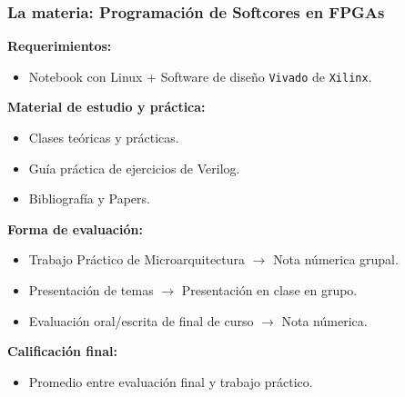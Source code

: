\documentclass[aspectratio=169]{beamer}
\begin{document}
\begin{frame}[fragile]
    \frametitle{\large La materia: \Large Programación de Softcores en FPGAs}
    \textbf{Requerimientos:}
    \begin{itemize}
    \item Notebook con Linux + Software de diseño \texttt{Vivado} de \texttt{Xilinx}.\\
    \end{itemize}
    \pause
    \vspace{0.2cm}
    \textbf{Material de estudio y práctica:}
    \begin{itemize}
    \item Clases teóricas y prácticas.
    \item Guía práctica de ejercicios de Verilog.
    \item Bibliografía y Papers.
    \end{itemize}
    \pause
    \vspace{0.2cm}
    \textbf{Forma de evaluación:}
    \begin{itemize}
    \item Trabajo Práctico de Microarquitectura $\rightarrow$ \textcolor{verdeuca}{Nota númerica grupal.}\\
    \item Presentación de temas $\rightarrow$ \textcolor{verdeuca}{Presentación en clase en grupo.}\\
    \item Evaluación oral/escrita de final de curso $\rightarrow$ \textcolor{verdeuca}{Nota númerica.}\\
    \end{itemize}
    \pause
    \vspace{0.2cm}
    \textbf{Calificación final:}
    \begin{itemize}
     \item Promedio entre evaluación final y trabajo práctico.\\
    \end{itemize}
\end{frame}
\end{document}
